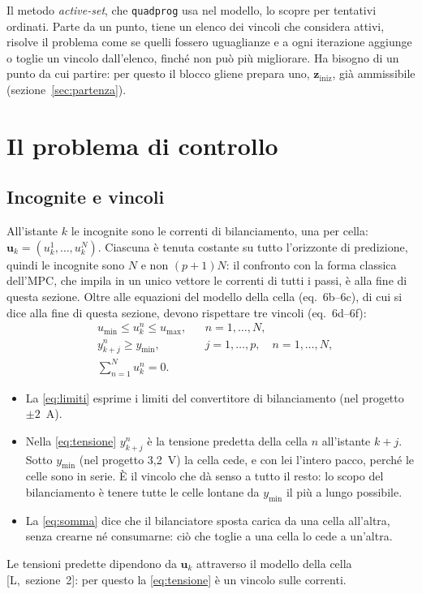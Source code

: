 \documentclass[11pt,a4paper]{article}
\newcommand{\vett}[1]{\boldsymbol{#1}}      %
\begin{document}
Il metodo \emph{active-set}, che \texttt{quadprog} usa nel modello, lo scopre
per tentativi ordinati. Parte da un punto, tiene un elenco dei vincoli che
considera attivi, risolve il problema come se quelli fossero uguaglianze e a
ogni iterazione aggiunge o toglie un vincolo dall'elenco, finché non può più
migliorare. Ha bisogno di un punto da cui partire: per questo il blocco gliene
prepara uno, $\vett{z}_{\mathrm{iniz}}$, già ammissibile (sezione~\ref{sec:partenza}).

\section{Il problema di controllo}\label{sec:controllo}

\subsection{Incognite e vincoli}\label{sec:vincoli-problema}

All'istante $k$ le incognite sono le correnti di bilanciamento, una per cella:
$\vett{u}_k = (u^1_k, \dots, u^N_k)$. Ciascuna è tenuta costante su tutto l'orizzonte di
predizione, quindi le incognite sono $N$ e non $(p+1)N$: il confronto con la
forma classica dell'MPC, che impila in un unico vettore le correnti di tutti i
passi, è alla fine di questa sezione. Oltre alle equazioni del
modello della cella (eq.~6b--6c), di cui si dice alla fine di questa sezione,
devono rispettare tre vincoli (eq.~6d--6f):
\begin{align}
  & u_{\min} \le u^n_k \le u_{\max} ,
     && n = 1,\dots,N , \label{eq:limiti}\\
  & y^n_{k+j} \ge y_{\min} ,
     && j = 1,\dots,p , \quad n = 1,\dots,N , \label{eq:tensione}\\
  & \sum_{n=1}^{N} u^n_k = 0 . \label{eq:somma}
\end{align}
\begin{itemize}
  \item La \eqref{eq:limiti} esprime i limiti del convertitore di
        bilanciamento (nel progetto $\pm 2$~A).
  \item Nella \eqref{eq:tensione} $y^n_{k+j}$ è la tensione predetta della
        cella $n$ all'istante $k+j$. Sotto $y_{\min}$ (nel progetto 3,2~V) la
        cella cede, e con lei l'intero pacco, perché le celle sono in serie. È
        il vincolo che dà senso a tutto il resto: lo scopo del bilanciamento è
        tenere tutte le celle lontane da $y_{\min}$ il più a lungo possibile.
  \item La \eqref{eq:somma} dice che il bilanciatore sposta carica da una
        cella all'altra, senza crearne né consumarne: ciò che toglie a una
        cella lo cede a un'altra.
\end{itemize}
Le tensioni predette dipendono da $\vett{u}_k$ attraverso il modello della cella
[L,~sezione~2]: per questo la \eqref{eq:tensione} è un vincolo sulle correnti.
\end{document}
